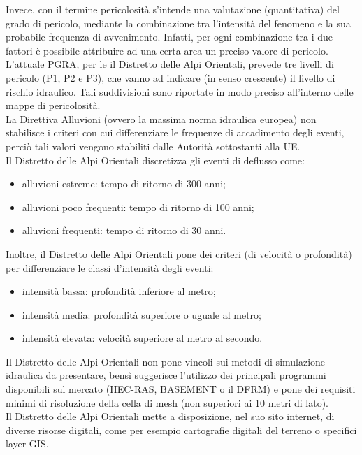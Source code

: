 Invece, con il termine pericolosità s'intende una valutazione (quantitativa) del grado di pericolo, mediante la combinazione tra l'intensità del fenomeno e la sua probabile frequenza di avvenimento. Infatti, per ogni combinazione tra i due fattori è possibile attribuire ad una certa area un preciso valore di pericolo.\\
L'attuale PGRA, per le il Distretto delle Alpi Orientali, prevede tre livelli di pericolo (P1, P2 e P3), che vanno ad indicare (in senso crescente) il livello di rischio idraulico. Tali suddivisioni sono riportate in modo preciso all'interno delle mappe di pericolosità.\\
La Direttiva Alluvioni (ovvero la massima norma idraulica europea) non stabilisce i criteri con cui differenziare le frequenze di accadimento degli eventi, perciò tali valori vengono stabiliti dalle Autorità sottostanti alla UE.\\
Il Distretto delle Alpi Orientali discretizza gli eventi di deflusso come:
\begin{itemize}
    \item alluvioni estreme: tempo di ritorno di 300 anni;
    \item alluvioni poco frequenti: tempo di ritorno di 100 anni;
    \item alluvioni frequenti: tempo di ritorno di 30 anni.
\end{itemize}
Inoltre, il Distretto delle Alpi Orientali pone dei criteri (di velocità o profondità) per differenziare le classi d'intensità degli eventi:
\begin{itemize}
    \item intensità bassa: profondità inferiore al metro;
    \item intensità media: profondità superiore o uguale al metro;
    \item intensità elevata: velocità superiore al metro al secondo.
\end{itemize}

Il Distretto delle Alpi Orientali non pone vincoli sui metodi di simulazione idraulica da presentare, bensì suggerisce l'utilizzo dei principali programmi disponibili sul mercato (HEC-RAS, BASEMENT o il DFRM) e pone dei requisiti minimi di risoluzione della cella di mesh (non superiori ai 10 metri di lato).\\
Il Distretto delle Alpi Orientali mette a disposizione, nel suo sito internet, di diverse risorse digitali, come per esempio cartografie digitali del terreno o specifici layer GIS. 
